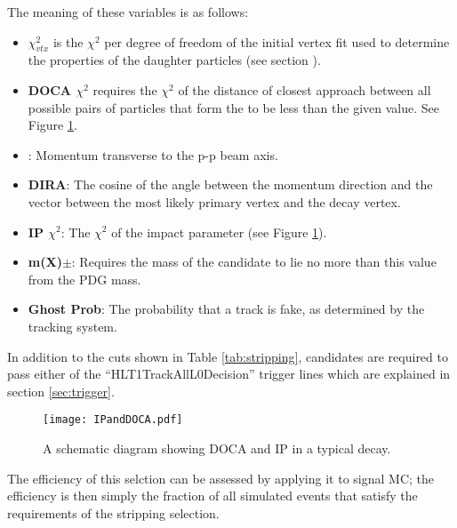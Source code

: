 The meaning of these variables is as follows:
\begin{itemize}
\item \textbf{$\chi_{vtx}^2$} is the $\chi^2$ per degree of freedom of the initial vertex fit used to determine the properties of the daughter particles (see section \label{sec:Decay Reconstruction}).
\item \textbf{DOCA $\chi^2$} requires the $\chi^2$ of the distance of closest approach between all possible pairs of particles that form the \Bd to be less than the given value. See Figure \ref{fig:DOCAandIP}.
\item \textbf{\pt}: Momentum transverse to the p-p beam axis.
\item \textbf{DIRA}: The cosine of the angle between the \Bd momentum direction and the vector between the most likely primary vertex and the \Bd decay vertex.
\item \textbf{IP $\chi^2$}: The $\chi^2$ of the impact parameter (see Figure \ref{fig:DOCAandIP}).
\item \textbf{m(X)$\pm$}: Requires the mass of the candidate to lie no more than this value from the PDG mass.
\item \textbf{Ghost Prob}: The probability that a track is fake, as determined by the \lhcb tracking system.
\end{itemize}
In addition to the cuts shown in Table \ref{tab:stripping}, candidates are required to pass either of the  ``HLT1TrackAllL0Decision'' trigger lines which are explained in section \ref{sec:trigger}.

\begin{figure}
  \texttt{[image: IPandDOCA.pdf]}
  \caption{A schematic diagram showing DOCA and IP in a typical \Bd decay.}
  \label{fig:DOCAandIP}
\end{figure}
The efficiency of this selction can be assessed by applying it to signal MC; the efficiency is then simply the fraction of all simulated events that satisfy the requirements of the stripping selection.


